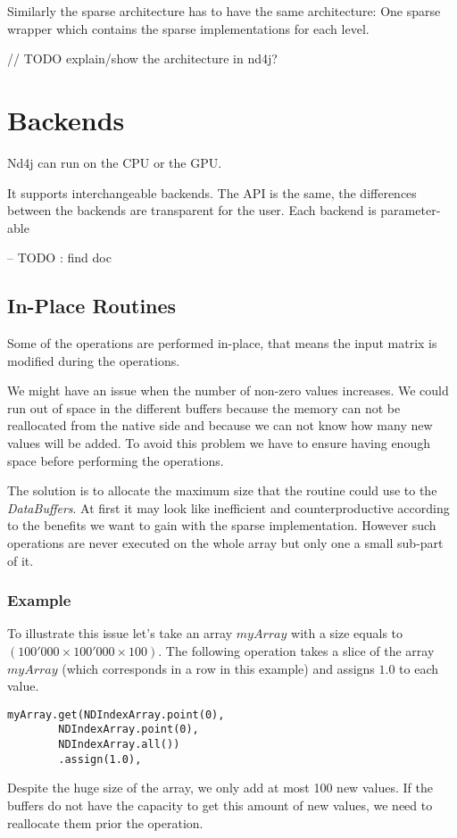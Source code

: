  Similarly the sparse architecture has to have the same architecture: One sparse wrapper which contains the sparse implementations for each level.
 
 // TODO explain/show the architecture in nd4j?
\section{Backends}

Nd4j can run on the CPU or the GPU. 

It supports interchangeable backends. The API is the same, the differences between the backends are transparent for the user.
Each backend is parameter-able 

-- TODO : find doc


\subsection{In-Place Routines}
Some of the operations are performed in-place, that means the input matrix is modified during the operations.

We might have an issue when the number of non-zero values increases. We could run out of space in the different buffers because the memory can not be reallocated from the native side and because we can not know how many new values will be added. To avoid this problem we have to ensure having enough space before performing the operations.

The solution is to allocate the maximum size that the routine could use to the \textit{DataBuffers}. At first it may look like inefficient and counterproductive according to the benefits we want to gain with the sparse implementation. However such operations are never executed on the whole array but only one a small sub-part of it.

\subsubsection{Example}
To illustrate this issue let's take an array $myArray$ with a size equals to $(100'000\times 100'000 \times 100)$. 
The following operation takes a slice of the array $myArray$ (which corresponds in a row in this example) and assigns $1.0$ to each value. 
\begin{lstlisting}[style=nonumbers]
	myArray.get(NDIndexArray.point(0), 
		NDIndexArray.point(0), 
		NDIndexArray.all())
		.assign(1.0),
\end{lstlisting}
Despite the huge size of the array, we only add at most 100 new values. If the buffers do not have the capacity to get this amount of new values, we need to reallocate them prior the operation.



